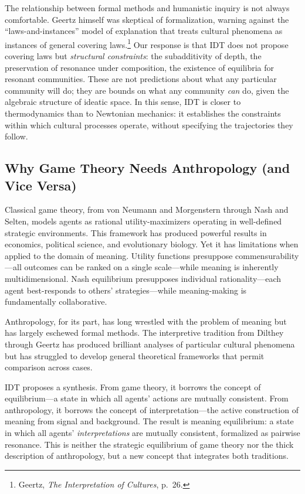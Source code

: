 The relationship between formal methods and humanistic inquiry is not
always comfortable.  Geertz himself was skeptical of formalization, warning
against the ``laws-and-instances'' model of explanation that treats cultural
phenomena as instances of general covering laws.\footnote{Geertz,
\textit{The Interpretation of Cultures}, p.\ 26.}  Our response is that
IDT does not propose covering laws but \emph{structural constraints}: the
subadditivity of depth, the preservation of resonance under composition,
the existence of equilibria for resonant communities.  These are not
predictions about what any particular community will do; they are bounds
on what any community \emph{can} do, given the algebraic structure of
ideatic space.  In this sense, IDT is closer to thermodynamics than to
Newtonian mechanics: it establishes the constraints within which cultural
processes operate, without specifying the trajectories they follow.

\subsection{Why Game Theory Needs Anthropology (and Vice Versa)}

Classical game theory, from von Neumann and Morgenstern through Nash and
Selten, models agents as rational utility-maximizers operating in
well-defined strategic environments.  This framework has produced powerful
results in economics, political science, and evolutionary biology.  Yet it
has limitations when applied to the domain of meaning.  Utility functions
presuppose commensurability---all outcomes can be ranked on a single
scale---while meaning is inherently multidimensional.  Nash equilibrium
presupposes individual rationality---each agent best-responds to others'
strategies---while meaning-making is fundamentally collaborative.

Anthropology, for its part, has long wrestled with the problem of meaning
but has largely eschewed formal methods.  The interpretive tradition from
Dilthey through Geertz has produced brilliant analyses of particular
cultural phenomena but has struggled to develop general theoretical
frameworks that permit comparison across cases.

IDT proposes a synthesis.  From game theory, it borrows the concept of
equilibrium---a state in which all agents' actions are mutually
consistent.  From anthropology, it borrows the concept of
interpretation---the active construction of meaning from signal and
background.  The result is meaning equilibrium: a state in which all
agents' \emph{interpretations} are mutually consistent, formalized as
pairwise resonance.  This is neither the strategic equilibrium of
game theory nor the thick description of anthropology, but a new concept
that integrates both traditions.

